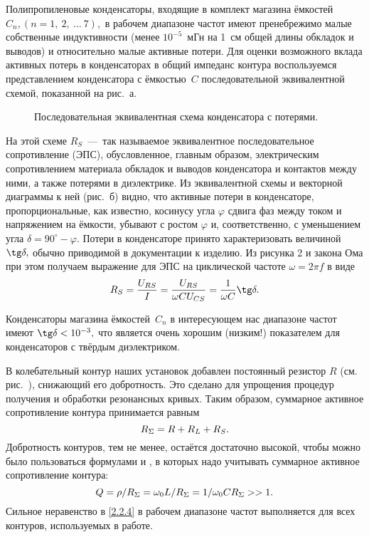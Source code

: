 Полипропиленовые конденсаторы, входящие в комплект магазина ёмкостей  $C_n,(n=1,~2,~\ldots~7),$ в рабочем диапазоне частот имеют пренебрежимо малые собственные индуктивности (менее $10^{-5}$~мГн на 1~см общей длины обкладок и выводов) и относительно малые активные потери. Для оценки возможного вклада активных потерь в конденсаторах в общий импеданс контура воспользуемся представлением конденсатора с ёмкостью~$C$ последовательной эквивалентной схемой, показанной на рис.~а.
\begin{figure}[h!]
	\caption{Последовательная эквивалентная схема конденсатора с потерями.}
\end{figure}
На этой схеме $R_S$~---~так называемое эквивалентное последовательное сопротивление (ЭПС), обусловленное, главным образом, электрическим сопротивлением материала обкладок и выводов конденсатора и контактов между ними, а также потерями в диэлектрике. Из эквивалентной схемы и векторной диаграммы к ней (рис.~б) видно, что активные потери в конденсаторе, пропорциональные, как известно, косинусу угла $\varphi$ сдвига фаз между током и напряжением на ёмкости, убывают с ростом $\varphi$ и, соответственно, с уменьшением угла $\delta=90^{\circ}-\varphi.$ Потери в конденсаторе принято характеризовать величиной $\tg\delta,$ обычно приводимой в документации к изделию. Из рисунка 2 и закона Ома при этом получаем выражение для ЭПС на циклической частоте $\omega=2\pi f$ в виде
\begin{equation}\eqmark{2.2.1}
	R_S=\dfrac{U_{RS}}{I}=\dfrac{U_{RS}}{\omega CU_{CS}}=\dfrac{1}{\omega C}\tg\delta.
\end{equation}

Конденсаторы магазина ёмкостей~$C_n$ в интересующем нас диапазоне частот имеют $\tg\delta<10^{-3},$ что является очень хорошим (низким!) показателем для конденсаторов с твёрдым диэлектриком.

В колебательный контур наших установок добавлен постоянный резистор $R$ (см. рис.~), снижающий его добротность. Это сделано для упрощения процедур получения и обработки резонансных кривых. Таким образом, суммарное активное сопротивление контура принимается равным
\begin{equation}\eqmark{2.2.2}
	R_{\Sigma}=R+R_L+R_S.
\end{equation}
Добротность контуров, тем не менее, остаётся достаточно высокой, чтобы можно было пользоваться формулами  и , в которых надо учитывать суммарное активное сопротивление контура:
\begin{equation}\eqmark{2.2.3}
	Q=\rho/R_{\Sigma}=\omega_0L/R_{\Sigma}=1/\omega_0CR_{\Sigma}>>1.
\end{equation}
Сильное неравенство в \eqref{2.2.4} в рабочем диапазоне частот выполняется для всех контуров, используемых в работе.

